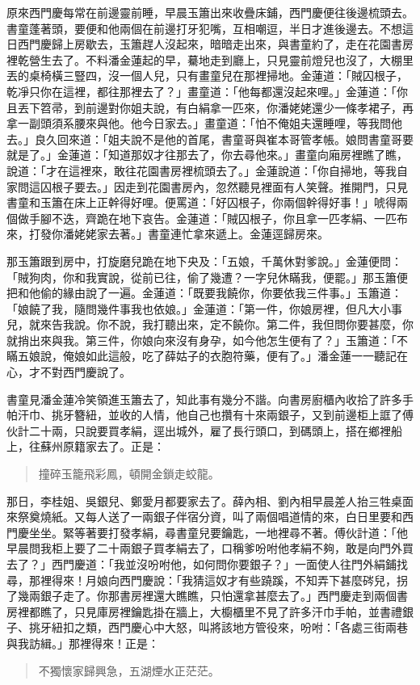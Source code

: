 原來西門慶每常在前邊靈前睡，早晨玉簫出來收疊床鋪，西門慶便往後邊梳頭去。書童蓬著頭，要便和他兩個在前邊打牙犯嘴，互相嘲逗，半日才進後邊去。不想這日西門慶歸上房歇去，玉簫趕人沒起來，暗暗走出來，與書童約了，走在花園書房裡乾營生去了。不料潘金蓮起的早，驀地走到廳上，只見靈前燈兒也沒了，大棚里丟的桌椅橫三豎四，沒一個人兒，只有畫童兒在那裡掃地。金蓮道：「賊囚根子，乾凈只你在這裡，都往那裡去了？」畫童道：「他每都還沒起來哩。」金蓮道：「你且丟下笤帚，到前邊對你姐夫說，有白絹拿一匹來，你潘姥姥還少一條孝裙子，再拿一副頭須系腰來與他。他今日家去。」畫童道：「怕不俺姐夫還睡哩，等我問他去。」良久回來道：「姐夫說不是他的首尾，書童哥與崔本哥管孝帳。娘問書童哥要就是了。」金蓮道：「知道那奴才往那去了，你去尋他來。」畫童向廂房裡瞧了瞧，說道：「才在這裡來，敢往花園書房裡梳頭去了。」金蓮說道：「你自掃地，等我自家問這囚根子要去。」因走到花園書房內，忽然聽見裡面有人笑聲。推開門，只見書童和玉簫在床上正幹得好哩。便罵道：「好囚根子，你兩個幹得好事！」唬得兩個做手腳不迭，齊跪在地下哀告。金蓮道：「賊囚根子，你且拿一匹孝絹、一匹布來，打發你潘姥姥家去著。」書童連忙拿來遞上。金蓮逕歸房來。

那玉簫跟到房中，打旋磨兒跪在地下央及：「五娘，千萬休對爹說。」金蓮便問：「賊狗肉，你和我實說，從前已往，偷了幾遭？一字兒休瞞我，便罷。」那玉簫便把和他偷的緣由說了一遍。金蓮道：「既要我饒你，你要依我三件事。」玉簫道：「娘饒了我，隨問幾件事我也依娘。」金蓮道：「第一件，你娘房裡，但凡大小事兒，就來告我說。你不說，我打聽出來，定不饒你。第二件，我但問你要甚麼，你就捎出來與我。第三件，你娘向來沒有身孕，如今他怎生便有了？」玉簫道：「不瞞五娘說，俺娘如此這般，吃了薛姑子的衣胞符藥，便有了。」潘金蓮一一聽記在心，才不對西門慶說了。

書童見潘金蓮冷笑領進玉簫去了，知此事有幾分不諧。向書房廚櫃內收拾了許多手帕汗巾、挑牙簪紐，並收的人情，他自己也攢有十來兩銀子，又到前邊柜上誆了傅伙計二十兩，只說要買孝絹，逕出城外，雇了長行頭口，到碼頭上，搭在鄉裡船上，往蘇州原籍家去了。正是：
\begin{quote}
撞碎玉籠飛彩鳳，頓開金鎖走蛟龍。
\end{quote}

那日，李桂姐、吳銀兒、鄭愛月都要家去了。薛內相、劉內相早晨差人抬三牲桌面來祭奠燒紙。又每人送了一兩銀子伴宿分資，叫了兩個唱道情的來，白日里要和西門慶坐坐。緊等著要打發孝絹，尋書童兒要鑰匙，一地裡尋不著。傅伙計道：「他早晨問我柜上要了二十兩銀子買孝絹去了，口稱爹吩咐他孝絹不夠，敢是向門外買去了？」西門慶道：「我並沒吩咐他，如何問你要銀子？」一面使人往門外絹鋪找尋，那裡得來！月娘向西門慶說：「我猜這奴才有些蹺蹊，不知弄下甚麼硶兒，拐了幾兩銀子走了。你那書房裡還大瞧瞧，只怕還拿甚麼去了。」西門慶走到兩個書房裡都瞧了，只見庫房裡鑰匙掛在牆上，大櫥櫃里不見了許多汗巾手帕，並書禮銀子、挑牙紐扣之類，西門慶心中大怒，叫將該地方管役來，吩咐：「各處三街兩巷與我訪緝。」那裡得來！正是：
\begin{quote}
不獨懷家歸興急，五湖煙水正茫茫。
\end{quote}

